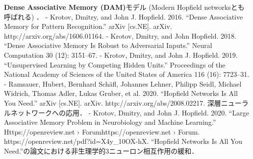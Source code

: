 \textbf{Dense Associative Memory (DAM)}モデル (Modern Hopfield networksとも呼ばれる) ．
- Krotov, Dmitry, and John J. Hopfield. 2016. “Dense Associative Memory for Pattern Recognition.” arXiv [cs.NE]. arXiv. http://arxiv.org/abs/1606.01164.
- Krotov, Dmitry, and John Hopfield. 2018. “Dense Associative Memory Is Robust to Adversarial Inputs.” Neural Computation 30 (12): 3151–67.
- Krotov, Dmitry, and John J. Hopfield. 2019. “Unsupervised Learning by Competing Hidden Units.” Proceedings of the National Academy of Sciences of the United States of America 116 (16): 7723–31.
- Ramsauer, Hubert, Bernhard Schäfl, Johannes Lehner, Philipp Seidl, Michael Widrich, Thomas Adler, Lukas Gruber, et al. 2020. “Hopfield Networks Is All You Need.” arXiv [cs.NE]. arXiv. http://arxiv.org/abs/2008.02217.
深層ニューラルネットワークへの応用．
- Krotov, Dmitry, and John J. Hopfield. 2020. “Large Associative Memory Problem in Neurobiology and Machine Learning.” Https://openreview.net › Forumhttps://openreview.net › Forum. https://openreview.net/pdf?id=X4y_10OX-hX.
“Hopfield Networks Is All You Need.”の論文における非生理学的3ニューロン相互作用の緩和．